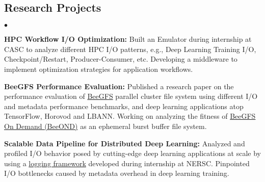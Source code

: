\documentclass[margin,line]{res}
\newenvironment{list2}{
  \begin{list}{$\bullet$}{%
      \setlength{\itemsep}{0in}
      \setlength{\parsep}{0in} \setlength{\parskip}{0in}
      \setlength{\topsep}{0in} \setlength{\partopsep}{0in} 
      \setlength{\leftmargin}{0.2in}}}{\end{list}}
\begin{document}
\begin{resume}
\section{\sc Research Projects}
\begin{list2}
\item {\bf HPC Workflow I/O Optimization:} Built an Emulator during internship at CASC to analyze different HPC I/O patterns, e.g., Deep Learning Training I/O, Checkpoint/Restart, Producer-Consumer, etc. Developing a middleware to implement optimization strategies for application workflows.
\item {\bf BeeGFS Performance Evaluation:} Published a research paper on the performance evaluation of \href{https://www.beegfs.io/content/}{BeeGFS} parallel cluster file system using different I/O and metadata performance benchmarks, and deep learning applications atop TensorFlow, Horovod and LBANN. Working on analyzing the fitness of \href{http://www.beegfs.io/wiki/BeeOND}{BeeGFS On Demand (BeeOND)} as an ephemeral burst buffer file system.
\item {\bf Scalable Data Pipeline for Distributed Deep Learning:} Analyzed and profiled I/O behavior posed by cutting-edge deep learning applications at scale by using a \href{https://github.com/NERSC/DL-Parallel-IO}{logging framework} developed during internship at NERSC. Pinpointed I/O bottlenecks caused by metadata overhead in deep learning training.
\end{list2}

\vspace*{-.1in}


\end{resume}
\end{document}
